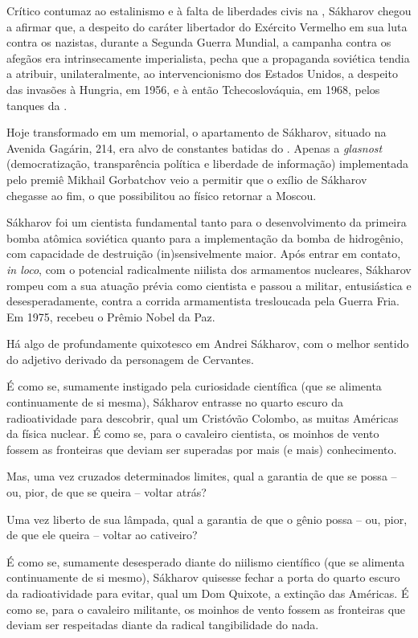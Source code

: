 Crítico contumaz ao estalinismo e à falta de liberdades civis na ,
Sákharov chegou a afirmar que, a despeito do caráter libertador do
Exército Vermelho em sua luta contra os nazistas, durante a Segunda
Guerra Mundial, a campanha contra os afegãos era intrinsecamente
imperialista, pecha que a propaganda soviética tendia a atribuir,
unilateralmente, ao intervencionismo dos Estados Unidos, a despeito das
invasões à Hungria, em 1956, e à então Tchecoslováquia, em 1968, pelos
tanques da .

Hoje transformado em um memorial, o apartamento de Sákharov, situado na
Avenida Gagárin, 214, era alvo de constantes batidas do . Apenas a
\emph{glasnost} (democratização, transparência política e liberdade de
informação) implementada pelo premiê Mikhail Gorbatchov veio a permitir
que o exílio de Sákharov chegasse ao fim, o que possibilitou ao físico
retornar a Moscou.

Sákharov foi um cientista fundamental tanto para o desenvolvimento da
primeira bomba atômica soviética quanto para a implementação da bomba de
hidrogênio, com capacidade de destruição (in)sensivelmente maior. Após
entrar em contato, \emph{in loco}, com o potencial radicalmente niilista
dos armamentos nucleares, Sákharov rompeu com a sua atuação prévia como
cientista e passou a militar, entusiástica e desesperadamente, contra a
corrida armamentista tresloucada pela Guerra Fria. Em 1975, recebeu o
Prêmio Nobel da Paz.

Há algo de profundamente quixotesco em Andrei Sákharov, com o melhor
sentido do adjetivo derivado da personagem de Cervantes.

É como se, sumamente instigado pela curiosidade científica (que se
alimenta continuamente de si mesma), Sákharov entrasse no quarto escuro
da radioatividade para descobrir, qual um Cristóvão Colombo, as muitas
Américas da física nuclear. É como se, para o cavaleiro cientista, os
moinhos de vento fossem as fronteiras que deviam ser superadas por mais
(e mais) conhecimento.

Mas, uma vez cruzados determinados limites, qual a garantia de que se
possa -- ou, pior, de que se queira -- voltar atrás?

Uma vez liberto de sua lâmpada, qual a garantia de que o gênio possa --
ou, pior, de que ele queira -- voltar ao cativeiro?

É como se, sumamente desesperado diante do niilismo científico (que se
alimenta continuamente de si mesmo), Sákharov quisesse fechar a porta do
quarto escuro da radioatividade para evitar, qual um Dom Quixote, a
extinção das Américas. É como se, para o cavaleiro militante, os moinhos
de vento fossem as fronteiras que deviam ser respeitadas diante da
radical tangibilidade do nada.

